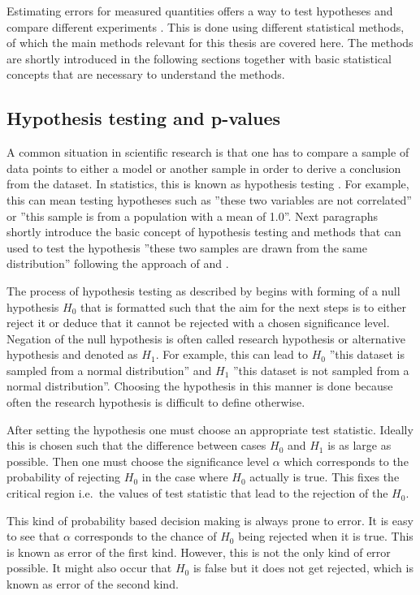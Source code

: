 \documentclass[english, oneside]{HYgradu}
\begin{document}
Estimating errors for measured quantities offers a way to test hypotheses and compare different experiments \citep{bohm2010introduction}. This is done using different statistical methods, of which the main methods relevant for this thesis are covered here. The methods are shortly introduced in the following sections together with basic statistical concepts that are necessary to understand the methods. 


\subsection{Hypothesis testing and p-values}
A common situation in scientific research is that one has to compare a sample of data points to either a model or another sample in order to derive a conclusion from the dataset. In statistics, this is known as hypothesis testing \citep{wall2003practical}. For example, this can mean testing hypotheses such as ''these two variables are not correlated'' or ''this sample is from a population with a mean of 1.0''. Next paragraphs shortly introduce the basic concept of hypothesis testing and methods that can used to test the hypothesis ''these two samples are drawn from the same distribution'' following the approach of \citep{bohm2010introduction} and \citep{wall2003practical}.

The process of hypothesis testing as described by \citet{bohm2010introduction} begins with forming of a null hypothesis $H_0$ that is formatted such that the aim for the next steps is to either reject it or deduce that it cannot be rejected with a chosen significance level. Negation of the null hypothesis is often called research hypothesis or alternative hypothesis and denoted as $H_1$. For example, this can lead to $H_0$ ''this dataset is sampled from a normal distribution'' and $H_1$ ''this dataset is not sampled from a normal distribution''. Choosing the hypothesis in this manner is done because often the research hypothesis is difficult to define otherwise.

After setting the hypothesis one must choose an appropriate test statistic. Ideally this is chosen such that the difference between cases $H_0$ and $H_1$ is as large as possible. Then one must choose 
the significance level $\alpha$ which corresponds to the probability of rejecting $H_0$ in the case where $H_0$ actually is true. This fixes the critical region i.e.\ the values of test statistic that lead to the rejection of the $H_0$. 

This kind of probability based decision making is always prone to error. It is easy to see that $\alpha$ corresponds to the chance of $H_0$ being rejected when it is true. This is known as error of the first kind. However, this is not the only kind of error possible. It might also occur that $H_0$ is false but it does not get rejected, which is known as error of the second kind.
\end{document}
